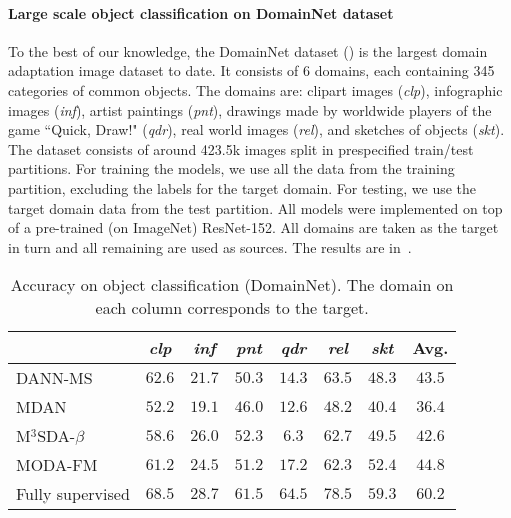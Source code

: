 \paragraph{Large scale object classification on DomainNet dataset} To the best of our knowledge, the DomainNet dataset (\citet{Peng2019}) is the largest domain adaptation image dataset to date. It consists of 6 domains, each containing 345 categories of common objects. The domains are: clipart images (\textit{clp}), infographic images (\textit{inf}), artist paintings (\textit{pnt}), drawings made by worldwide players of the game ``Quick, Draw!" (\textit{qdr}), real world images (\textit{rel}), and sketches of objects (\textit{skt}). The dataset consists of around 423.5k images split in prespecified train/test partitions. For training the models, we use all the data from the training partition, excluding the labels for the target domain. For testing, we use the target domain data from the test partition. All models were implemented on top of a pre-trained (on ImageNet) ResNet-152. All domains are taken as the target in turn and all remaining are used as sources. The results are in~.

\begin{table}[]
	\centering
	\footnotesize
	\begin{tabular}{l|cccccc:c}
		& \textit{clp} & \textit{inf} & \textit{pnt} & \textit{qdr}  & \textit{rel} & \textit{skt} & Avg. \\ \hline
		DANN-MS \cite{Ganin2015} & $\boldsymbol{62.6}$ & $21.7$  & $50.3$ & $14.3$ & $\boldsymbol{63.5}$ & $48.3$ & $43.5$ \\
		MDAN \cite{Zhao2018} & $52.2$ & $19.1$ & $46.0$ & $12.6$ & $48.2$& $40.4$ & $36.4$\\
		M$^3$SDA-$\beta$ \cite{Peng2019} & $58.6$& $\boldsymbol{26.0}$& $\boldsymbol{52.3}$ & $6.3$& $62.7$ & $49.5$ & $42.6$\\ \hline
		MODA-FM       & $61.2$ & $24.5$  & $51.2$  & $\boldsymbol{17.2}$  & $62.3$ & $\boldsymbol{52.4}$ & $\boldsymbol{44.8}$\\ \hline
		Fully supervised & $68.5$ & $28.7$ & $61.5$ & $64.5$ & $78.5$ & $59.3$ & $60.2$
	\end{tabular}
	\caption{Accuracy on object classification (DomainNet). The domain on each column corresponds to the target.}
	\label{tab:domainnet_acc}
\end{table}

